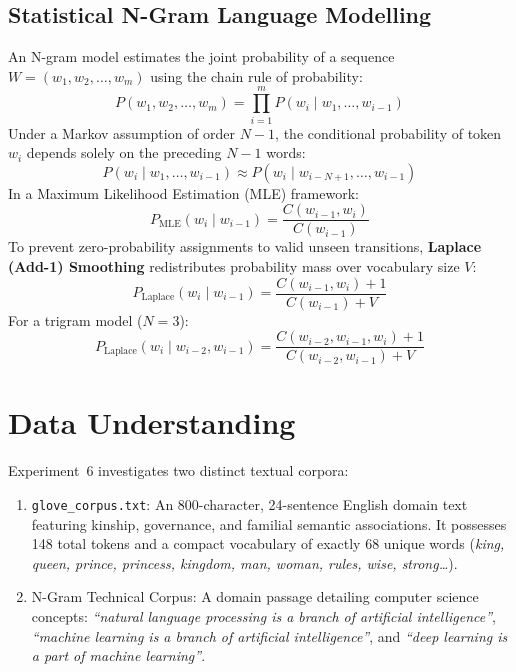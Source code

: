 \subsection{Statistical N-Gram Language Modelling}
An N-gram model estimates the joint probability of a sequence $W = (w_1, w_2, \dots, w_m)$ using the chain rule of probability:
\begin{equation}
    P(w_1, w_2, \dots, w_m) = \prod_{i=1}^{m} P(w_i \mid w_1, \dots, w_{i-1})
\end{equation}
Under a Markov assumption of order $N-1$, the conditional probability of token $w_i$ depends solely on the preceding $N-1$ words:
\begin{equation}
    P(w_i \mid w_1, \dots, w_{i-1}) \approx P(w_i \mid w_{i-N+1}, \dots, w_{i-1})
\end{equation}
In a Maximum Likelihood Estimation (MLE) framework:
\begin{equation}
    P_{\text{MLE}}(w_i \mid w_{i-1}) = \frac{C(w_{i-1}, w_i)}{C(w_{i-1})}
\end{equation}
To prevent zero-probability assignments to valid unseen transitions, \textbf{Laplace (Add-1) Smoothing} redistributes probability mass over vocabulary size $V$:
\begin{equation}
    P_{\text{Laplace}}(w_i \mid w_{i-1}) = \frac{C(w_{i-1}, w_i) + 1}{C(w_{i-1}) + V}
\end{equation}
For a trigram model ($N=3$):
\begin{equation}
    P_{\text{Laplace}}(w_i \mid w_{i-2}, w_{i-1}) = \frac{C(w_{i-2}, w_{i-1}, w_i) + 1}{C(w_{i-2}, w_{i-1}) + V}
\end{equation}

\section{Data Understanding}
Experiment~6 investigates two distinct textual corpora:
\begin{enumerate}
    \item \texttt{glove\_corpus.txt}: An 800-character, 24-sentence English domain text featuring kinship, governance, and familial semantic associations. It possesses 148 total tokens and a compact vocabulary of exactly 68 unique words (\textit{king, queen, prince, princess, kingdom, man, woman, rules, wise, strong\dots}).
    \item N-Gram Technical Corpus: A domain passage detailing computer science concepts: \textit{``natural language processing is a branch of artificial intelligence''}, \textit{``machine learning is a branch of artificial intelligence''}, and \textit{``deep learning is a part of machine learning''}.
\end{enumerate}

